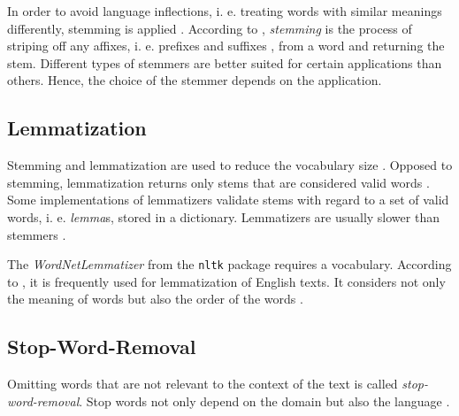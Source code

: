 In order to avoid language inflections, i. e. treating words with similar meanings differently, stemming is applied \cite{clusteringDocs2020}.
According to \citeauthor{nlp-book2009}, \textit{stemming} is the process of striping off any affixes, i. e. prefixes and suffixes \cite{IR2011}, 
from a word and returning the stem.
Different types of stemmers are better suited for certain applications than others.
Hence, the choice of the stemmer depends on the application.


\subsection{Lemmatization}\label{subsec:lemmatization}

Stemming and lemmatization are used to reduce the vocabulary size \cite{clusteringDocs2020}.
Opposed to stemming, lemmatization returns only stems that are considered valid words \cite{nlp-book2009}.
Some implementations of lemmatizers validate stems with regard to a set of valid words, i. e. \textit{lemma}s, stored in a dictionary.
Lemmatizers are usually slower than stemmers \cite{nlp-book2009}.

The \textit{WordNetLemmatizer} from the \texttt{nltk} package requires a vocabulary. %
According to \citeauthor{clusteringDocs2020}, it is frequently used for lemmatization of English texts.
It considers not only the meaning of words but also the order of the words \cite{clusteringDocs2020}.


\subsection{Stop-Word-Removal}\label{subsec:stop-word-removal}

Omitting words that are not relevant to the context of the text is called \textit{stop-word-removal}.
Stop words not only depend on the domain but also the language \cite{IR2011}.



